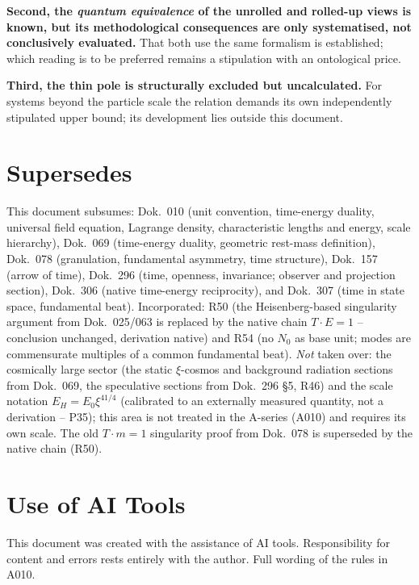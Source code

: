 \textbf{Second, the \emph{quantum equivalence} of the unrolled and rolled-up
views is known, but its methodological consequences are only systematised, not
conclusively evaluated.} That both use the same formalism is established; which
reading is to be preferred remains a stipulation with an ontological price.

\textbf{Third, the thin pole is structurally excluded but uncalculated.} For
systems beyond the particle scale the relation demands its own independently
stipulated upper bound; its development lies outside this document.

\section{Supersedes}

This document subsumes: Dok.~010 (unit convention, time-energy duality,
universal field equation, Lagrange density, characteristic lengths and energy,
scale hierarchy), Dok.~069 (time-energy duality, geometric rest-mass definition),
Dok.~078 (granulation, fundamental asymmetry, time structure), Dok.~157 (arrow
of time), Dok.~296 (time, openness, invariance; observer and projection section),
Dok.~306 (native time-energy reciprocity), and Dok.~307 (time in state space,
fundamental beat). Incorporated: R50 (the Heisenberg-based singularity argument
from Dok.~025/063 is replaced by the native chain $T\cdot E=1$ -- conclusion
unchanged, derivation native) and R54 (no $N_0$ as base unit; modes are
commensurate multiples of a common fundamental beat). \emph{Not} taken over: the
cosmically large sector (the static $\xi$-cosmos and background radiation sections
from Dok.~069, the speculative sections from Dok.~296 §5, R46) and the scale
notation $E_H=E_0\xi^{41/4}$ (calibrated to an externally measured quantity, not
a derivation -- P35); this area is not treated in the A-series (A010) and requires
its own scale. The old $T\cdot m=1$ singularity proof from Dok.~078 is superseded
by the native chain (R50).

\section{Use of AI Tools}

This document was created with the assistance of AI tools.
Responsibility for content and errors rests entirely with the author.
Full wording of the rules in A010.
